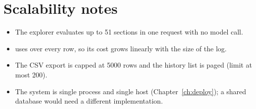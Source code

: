 \section{Scalability notes}
\begin{itemize}
  \item The explorer evaluates up to 51 sections in one request with no model call.
  \item {} uses  over every row, so its cost grows linearly with the size of the log.
  \item The CSV export is capped at 5000 rows and the history list is paged (limit at most 200).
  \item The system is single process and single host (Chapter~\ref{ch:deploy}); a shared database would need a different  implementation.
\end{itemize}
